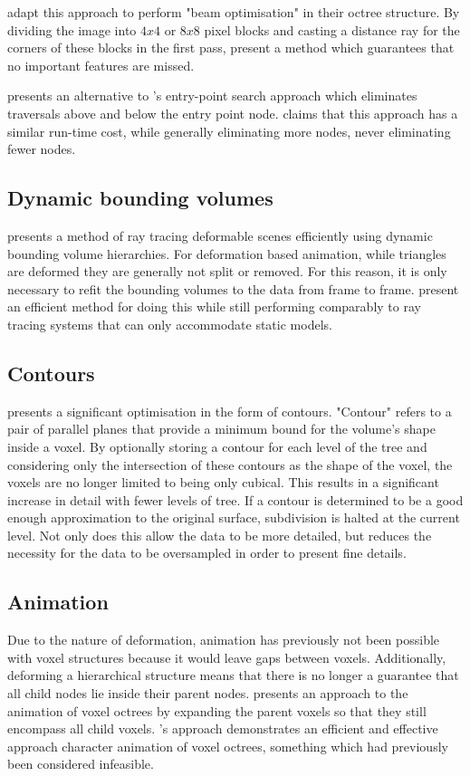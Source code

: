 \cite{laine10efficientsvos} adapt this approach to perform "beam optimisation" in their octree structure. By dividing the image into $4x4$ or $8x8$ pixel blocks and casting a distance ray for the corners of these blocks in the first pass, \citeauthor{laine10efficientsvos} present a method which guarantees that no important features are missed.

\cite{barczakunpublishedimproved} presents an alternative to \citeauthor{reshetov05mrta}'s entry-point search approach which eliminates traversals above and below the entry point node. \citeauthor{barczakunpublishedimproved} claims that this approach has a similar run-time cost, while generally eliminating more nodes, never eliminating fewer nodes.

\subsection{Dynamic bounding volumes}
\cite{wald07deformablebvh} presents a method of ray tracing deformable scenes efficiently using dynamic bounding volume hierarchies. For deformation based animation, while triangles are deformed they are generally not split or removed. For this reason, it is only necessary to refit the bounding volumes to the data from frame to frame. \citeauthor{wald07deformablebvh} present an efficient method for doing this while still performing comparably to ray tracing systems that can only accommodate static models.

\subsection{Contours}
\cite{laine10efficientsvos} presents a significant optimisation in the form of contours. "Contour" refers to a pair of parallel planes that provide a minimum bound for the volume's shape inside a voxel. By optionally storing a contour for each level of the tree and considering only the intersection of these contours as the shape of the voxel, the voxels are no longer limited to being only cubical. This results in a significant increase in detail with fewer levels of tree. If a contour is determined to be a good enough approximation to the original surface, subdivision is halted at the current level. Not only does this allow the data to be more detailed, but reduces the necessity for the data to be oversampled in order to present fine details.

\subsection{Animation}
Due to the nature of deformation, animation has previously not been possible with voxel structures because it would leave gaps between voxels. Additionally, deforming a hierarchical structure means that there is no longer a guarantee that all child nodes lie inside their parent nodes. \cite{bautembach2011animated} presents an approach to the animation of voxel octrees by expanding the parent voxels so that they still encompass all child voxels. \citeauthor{bautembach2011animated}'s approach demonstrates an efficient and effective approach character animation of voxel octrees, something which had previously been considered infeasible.

